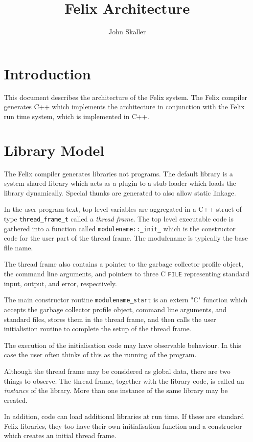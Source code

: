 \documentclass[oneside]{book}
\title{Felix Architecture}
\author{John Skaller}
\begin{document}
\maketitle
\tableofcontents
\chapter{Introduction}
This document describes the architecture of the Felix system.
The Felix compiler generates C++ which implements the architecture
in conjunction with the Felix run time system, which is implemented in C++.

\chapter{Library Model}
The Felix compiler generates libraries not programs.
The default library is a system shared library which acts as a plugin
to a stub loader which loads the library dynamically. Special thunks
are generated to also allow static linkage.

In the user program text, top level variables are aggregated in a C++ struct
of type \verb$thread_frame_t$ called a {\em thread frame}. The top level executable
code is gathered into a function called \verb$modulename::_init_$ which is the 
constructor code for the user part of the thread frame. The modulename is typically the base
file name.

The thread frame also contains a pointer to the garbage collector profile
object, the command line arguments, and pointers to three C \verb$FILE$ representing standard input,
output, and error, respectively.

The main constructor routine \verb$modulename_start$ is an extern "C" 
function which accepts the garbage collector profile object, command line arguments,
and standard files, stores them in the thread frame, and then calls the user initialistion
routine to complete the setup of the thread frame.

The execution of the initialisation code may have observable behaviour.
In this case the user often thinks of this as the running of the program.

Although the thread frame may be considered as global data, there are two
things to observe. The thread frame, together with the library code,
is called an {\em instance} of the library. More than one instance
of the same library may be created.

In addition, code can load additional libraries at run time. If these are
standard Felix libraries, they too have their own initialisation function
and a constructor which creates an initial thread frame.
\end{document}
